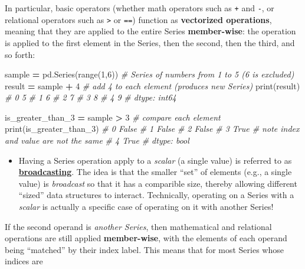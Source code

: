 \documentclass[]{book}
\newenvironment{Shaded}{\begin{snugshade}}{\end{snugshade}}
\newcommand{\DecValTok}[1]{\textcolor[rgb]{0.00,0.00,0.81}{#1}}
\newcommand{\CommentTok}[1]{\textcolor[rgb]{0.56,0.35,0.01}{\textit{#1}}}
\newcommand{\OperatorTok}[1]{\textcolor[rgb]{0.81,0.36,0.00}{\textbf{#1}}}
\newcommand{\BuiltInTok}[1]{#1}
\newcommand{\NormalTok}[1]{#1}
\providecommand{\tightlist}{%
  \setlength{\itemsep}{0pt}\setlength{\parskip}{0pt}}
\begin{document}
In particular, basic operators (whether math operators such as
\texttt{+} and \texttt{-}, or relational operators such as
\texttt{\textgreater{}} or \texttt{==}) function as \textbf{vectorized
operations}, meaning that they are applied to the entire Series
\textbf{member-wise}: the operation is applied to the first element in
the Series, then the second, then the third, and so forth:

\begin{Shaded}
\begin{Highlighting}[]
\NormalTok{sample }\OperatorTok{=}\NormalTok{ pd.Series(}\BuiltInTok{range}\NormalTok{(}\DecValTok{1}\NormalTok{,}\DecValTok{6}\NormalTok{))  }\CommentTok{# Series of numbers from 1 to 5 (6 is excluded)}
\NormalTok{result }\OperatorTok{=}\NormalTok{ sample }\OperatorTok{+} \DecValTok{4}  \CommentTok{# add 4 to each element (produces new Series)}
\BuiltInTok{print}\NormalTok{(result)}
    \CommentTok{# 0    5}
    \CommentTok{# 1    6}
    \CommentTok{# 2    7}
    \CommentTok{# 3    8}
    \CommentTok{# 4    9}
    \CommentTok{# dtype: int64}

\NormalTok{is_greater_than_3 }\OperatorTok{=}\NormalTok{ sample }\OperatorTok{>} \DecValTok{3}  \CommentTok{# compare each element}
\BuiltInTok{print}\NormalTok{(is_greater_than_3)}
    \CommentTok{# 0    False}
    \CommentTok{# 1    False}
    \CommentTok{# 2    False}
    \CommentTok{# 3     True  # note index and value are not the same}
    \CommentTok{# 4     True}
    \CommentTok{# dtype: bool}
\end{Highlighting}
\end{Shaded}

\begin{itemize}
\tightlist
\item
  Having a Series operation apply to a \emph{scalar} (a single value) is
  referred to as
  \href{https://docs.scipy.org/doc/numpy/user/basics.broadcasting.html}{\textbf{broadcasting}}.
  The idea is that the smaller ``set'' of elements (e.g., a single
  value) is \emph{broadcast} so that it has a comparible size, thereby
  allowing different ``sized'' data structures to interact. Technically,
  operating on a Series with a \emph{scalar} is actually a specific case
  of operating on it with another Series!
\end{itemize}

If the second operand is \emph{another Series}, then mathematical and
relational operations are still applied \textbf{member-wise}, with the
elements of each operand being ``matched'' by their index label. This
means that for most Series whose indices are
\end{document}
